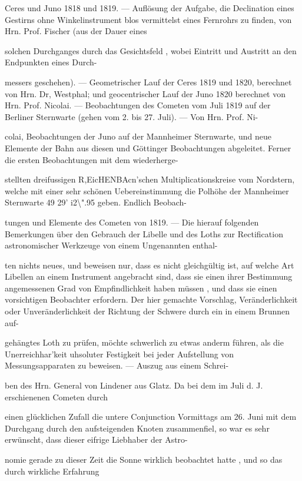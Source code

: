 \documentclass[10pt,a4paper]{article}
\begin{document}
Ceres und Juno 1818 und 1819. — Auflösung der Aufgabe, die Declination eines Gestirns ohne Winkelinstrument blos vermittelst eines Fernrohrs zu finden, von Hrn. Prof. Fischer (aus der Dauer eines

solchen Durchganges durch das Gesichtsfeld , wobei Eintritt und Austritt an den Endpunkten eines Durch-

messers geschehen). — Geometrischer Lauf der Ceres 1819 und 1820, berechnet von Hrn. Dr, Westphal; und geocentrischer Lauf der Juno 1820 berechnet von Hrn. Prof. Nicolai. — Beobachtungen des Cometen vom Juli 1819 auf der Berliner Sternwarte (gehen vom 2. bis 27. Juli). — Von Hrn. Prof. Ni-

colai, Beobachtungen der Juno auf der Mannheimer Sternwarte, und neue Elemente der Bahn aus diesen und Göttinger Beobachtungen abgeleitet. Ferner die ersten Beobachtungen mit dem wiederherge-

stellten dreifussigen R,EicHENBAcn'schen Multiplicationskreise vom Nordstern, welche mit einer sehr schönen Uebereinstimmung die Polhöhe der Mannheimer Sternwarte 49\textdegree{} 29' i2\textbackslash{}".95 geben. Endlich Beobach-

tungen und Elemente des Cometen von 1819. — Die hierauf folgenden Bemerkungen über den Gebrauch der Libelle und des Loths zur Rectification astronomischer Werkzeuge von einem Ungenannten enthal-

ten nichts neues, und beweisen nur, dass es nicht gleichgültig ist, auf welche Art Libellen an einem Instrument angebracht sind, dass sie einen ihrer Bestimmung angemessenen Grad von Empfindlichkeit haben müssen , und dass sie einen vorsichtigen Beobachter erfordern. Der hier gemachte Vorschlag, Veränderlichkeit oder Unveränderlichkeit der Richtung der Schwere durch ein in einem Brunnen auf-

gehängtes Loth zu prüfen, möchte schwerlich zu etwas anderm führen, als die Unerreichhar'keit uhsoluter Festigkeit bei jeder Aufstellung von Messungsapparaten zu beweisen. — Auszug aus einem Schrei-

ben des Hrn. General von Lindener aus Glatz. Da bei dem im Juli d. J. erschienenen Cometen durch

einen glücklichen Zufall die untere Conjunction Vormittags am 26. Juni mit dem Durchgang durch den aufsteigenden Knoten zusammenfiel, so war es sehr erwünscht, dass dieser eifrige Liebhaber der Astro-

nomie gerade zu dieser Zeit die Sonne wirklich beobachtet hatte , und so das durch wirkliche Erfahrung
\end{document}

